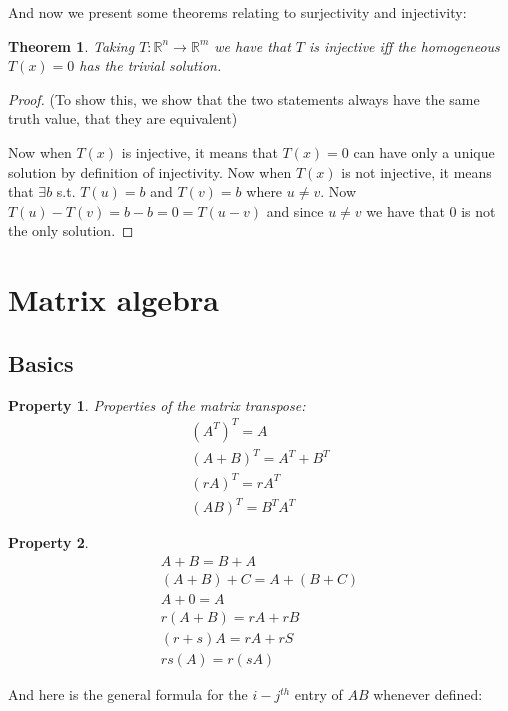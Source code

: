 \documentclass[titlepage]{article}
\newtheorem{thm}{Theorem}[subsection]
\newtheorem{property}{Property}
\numberwithin{equation}{subsection}
\begin{document}
And now we present some theorems relating to surjectivity and injectivity:

\begin{thm}
Taking $T: \mathbb{R}^n \to \mathbb{R}^m$ we have that $T$ is injective iff the homogeneous $T(x) = 0$ has the trivial solution. 
\end{thm}

\begin{proof}(To show this, we show that the two statements always have the same truth value, that they are equivalent)

Now when $T(x)$ is injective, it means that $T(x) = 0$ can have only a unique solution by definition of injectivity. Now when $T(x)$ is not injective, it means that $\exists b$ s.t. $T(u) = b$ and $T(v) = b$ where $u \not = v$. Now $T(u) - T(v) = b-b = 0 = T(u-v)$ and since $u\not=v$ we have that $0$ is not the only solution.
\end{proof}

\section{Matrix algebra}

\subsection{Basics}

\begin{property}
Properties of the matrix transpose:
\begin{align*}
    (A^T)^T = A\\
    (A + B)^T = A^T + B^T\\
    (rA)^T = rA^T\\
    (AB)^T = B^TA^T
\end{align*}
\end{property}



\begin{property}
\begin{align*}
    A + B = B + A\\
    (A + B) + C = A + (B + C)\\
    A + 0 = A\\
    r(A + B) = rA + rB\\
    (r+s)A = rA + rS\\
    rs(A) = r(sA)
\end{align*}
\end{property}

And here is the general formula for the $i-j^{th}$ entry of $AB$ whenever defined:
\end{document}
